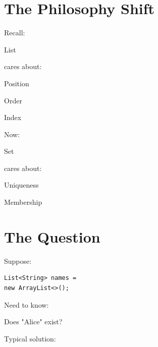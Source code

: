 \documentclass[11pt,a4paper]{book}
\begin{document}

\section{The Philosophy Shift}

Recall:


List


cares about:


Position

Order

Index


Now:


Set


cares about:


Uniqueness

Membership


\section{The Question}

Suppose:

\begin{verbatim} 
List<String> names =
new ArrayList<>();
\end{verbatim}


Need to know:


Does "Alice" exist?


Typical solution:
\end{document}
